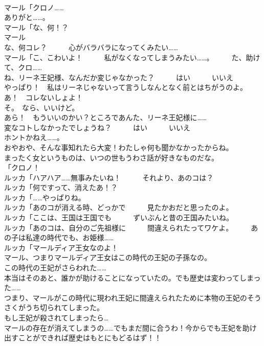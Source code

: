 \documentclass[8pt]{extreport}
\begin{document}
\begin{CJK}{UTF8}{min}
\\	マール「クロノ……	
\\	ありがと……。	
\\	マール「な、何！？	
\\	マール
\\	な、何コレ？　　　心がバラバラになってくみたい……	
\\	マール「こ、こわいよ！　　　私がなくなってしまうみたい……。　　　た、助けて、クロ……	
\\	ね、リーネ王妃様、なんだか変じゃなかった？　　　はい　　　いいえ	
\\	やっぱり！　私はリーネじゃないって言うしなんとなく前とはちがうのよ。	
\\	あ！　コレないしょよ！	
\\	そ。　なら、いいけど。	
\\	あら！　もういいのかい？ところであんた、リーネ王妃様に……	
\\	変なコトしなかったでしょうね？　　　はい　　　いいえ	
\\	ホントかねえ……。	
\\	おやおや、そんな事知れたら大変！わたしゃ何も聞かなかったからね。	
\\	まったく女というものは、いつの世もうわさ話が好きなものだな。	
\\	「クロノ！	
\\	ルッカ「ハアハア……無事みたいね！　　　それより、あのコは？	
\\	ルッカ「何ですって、消えたあ！？	
\\	ルッカ「……やっぱりね。	
\\	ルッカ「あのコが消える時、どっかで　　　見たかおだと思ったのよ。	
\\	ルッカ「ここは、王国は王国でも　　　ずいぶんと昔の王国みたいね。	
\\	ルッカ「あのコは、自分のご先祖様に　　　間違えられたってワケよ。　　　あの子は私達の時代でも、お姫様……	
\\	ルッカ「マールディア王女なのよ！	
\\	マール、つまりマールディア王女はこの時代の王妃の子孫なの。	
\\	この時代の王妃がさらわれた……	
\\	本当はそのあと、誰かが助けることになっていたの。でも歴史は変わってしまった……	
\\	つまり、マールがこの時代に現われ王妃に間違えられたために本物の王妃のそうさくがうち切られてしまった。	
\\	もし王妃が殺されてしまったら…	
\\	マールの存在が消えてしまうの……でもまだ間に合うわ！今からでも王妃を助け出すことができれば歴史はもとにもどるはず！！	

\end{CJK}
\end{document}
